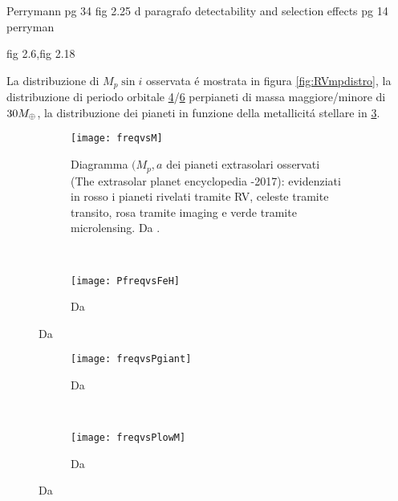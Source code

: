 \begin{workout}
Perrymann pg 34 fig 2.25 d
paragrafo detectability and selection effects pg 14 perryman
\end{workout}

\begin{workout}
fig 2.6,fig 2.18
\end{workout}


\begin{workout}

La distribuzione di $M_p\sin{i}$ osservata \'e mostrata in figura \ref{fig:RVmpdistro}, la distribuzione di periodo orbitale \ref{fig:PdistroM30}/\ref{fig:Pdistrom30} perpianeti di massa maggiore/minore di $30M_{\oplus}{}$, la distribuzione dei pianeti in funzione della metallicit\'a stellare in \ref{fig:freqZstar}.

\begin{figure}[!ht]
\begin{subfigure}[b]{0.47\textwidth}
\texttt{[image: freqvsM]}
\caption{Diagramma $(M_p,a$ dei pianeti extrasolari osservati (The extrasolar planet encyclopedia -2017): evidenziati in rosso i pianeti rivelati tramite RV, celeste tramite transito, rosa tramite imaging e verde tramite microlensing. Da \cite{howard2012planet}.}\label{fig:Mdistro}
\end{subfigure}
~
\begin{subfigure}[b]{0.47\textwidth}
\texttt{[image: PfreqvsFeH]}\label{fig:freqZstar}
\caption{Da \cite{mayor2011harps}}
\end{subfigure}
\end{figure}

\begin{figure}[!ht]
\begin{subfigure}[b]{0.47\textwidth}
\centering
\texttt{[image: freqvsPgiant]}
\caption{Da \cite{mayor2011harps}}\label{fig:PdistroM30}
\end{subfigure}
~
\begin{subfigure}[b]{0.47\textwidth}
\centering
\texttt{[image: freqvsPlowM]}\label{fig:Pdistrom30}
\caption{Da \cite{mayor2011harps}}
\end{subfigure}
\end{figure}

\end{workout}

